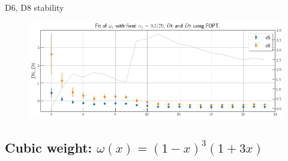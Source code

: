 \documentclass[../../index.tex]{subfiles}
\begin{document}
D6, D8 stability
\begin{figure}
  \centering
  \includegraphics[width=\textwidth]{./images/fitWKinD6D8.png}
\end{figure}

\subsection{Cubic weight: $\omega(x) = (1-x)^3(1+3x)$}
\end{document}
